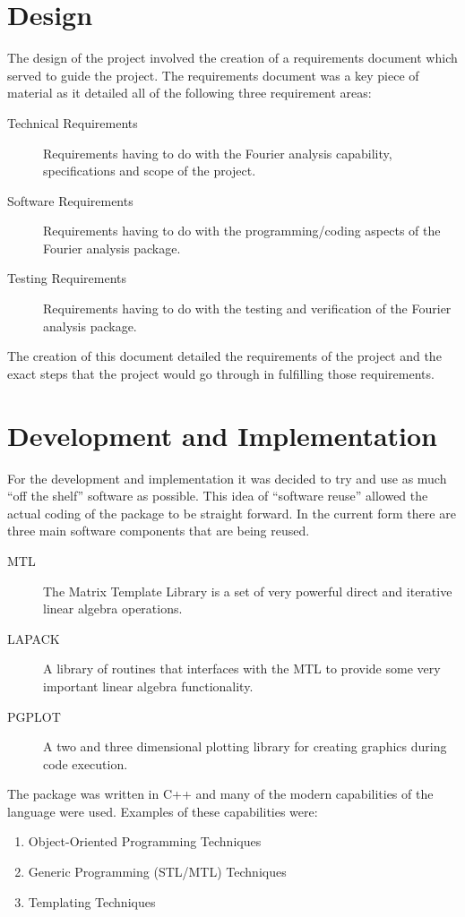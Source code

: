 \documentclass[11pt]{rnote}
\begin{document}
\section{Design}
\noindent
The design of the project involved the creation of a requirements
document which served to guide the project.  The requirements document 
was a key piece of material as it detailed all of the following three
requirement areas:
\begin{description}
 \item [Technical Requirements] Requirements having to do with the
   Fourier analysis capability, specifications and scope of the project.
 \item [Software Requirements] Requirements having to do with the
   programming/coding aspects of the Fourier analysis package.
 \item [Testing Requirements] Requirements having to do with the
 testing and verification of the Fourier analysis package.
\end{description}
The creation of this document detailed the requirements of the project 
and the exact steps that the project would go through in fulfilling
those requirements.
\section{Development and Implementation}
\noindent
For the development and implementation it was decided to try and use 
as much ``off the shelf'' software as possible.  This idea of
``software reuse'' allowed the actual coding of the package to be
straight forward.  In the current form there are three main software
components that are being reused.
\begin{description}
 \item [MTL] The Matrix Template Library is a set of very powerful
   direct and iterative linear algebra operations.
 \item [LAPACK] A library of routines that interfaces with the MTL to
   provide some very important linear algebra functionality.
 \item [PGPLOT] A two and three dimensional plotting library for
   creating graphics during code execution.
\end{description} 
The package was written in C++ and many of the modern capabilities of the
language were used.  Examples of these capabilities were:
\begin{enumerate}
 \item Object-Oriented Programming Techniques
 \item Generic Programming (STL/MTL) Techniques
 \item Templating Techniques
\end{enumerate}
\end{document}
